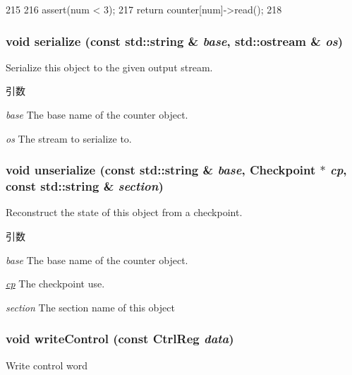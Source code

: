 \begin{DoxyCode}
215     {
216         assert(num < 3);
217         return counter[num]->read();
218     }
\end{DoxyCode}
\hypertarget{classIntel8254Timer_ab4138b21b48e3371a8e20df72b675a88}{
\subsubsection[{serialize}]{\setlength{\rightskip}{0pt plus 5cm}void serialize (const std::string \& {\em base}, \/  std::ostream \& {\em os})}}
\label{classIntel8254Timer_ab4138b21b48e3371a8e20df72b675a88}
Serialize this object to the given output stream. 
\begin{DoxyParams}{引数}
\item[{\em base}]The base name of the counter object. \item[{\em os}]The stream to serialize to. \end{DoxyParams}
\hypertarget{classIntel8254Timer_a147c320e3d6506edf5587a40cd8e430d}{
\subsubsection[{unserialize}]{\setlength{\rightskip}{0pt plus 5cm}void unserialize (const std::string \& {\em base}, \/  {\bf Checkpoint} $\ast$ {\em cp}, \/  const std::string \& {\em section})}}
\label{classIntel8254Timer_a147c320e3d6506edf5587a40cd8e430d}
Reconstruct the state of this object from a checkpoint. 
\begin{DoxyParams}{引数}
\item[{\em base}]The base name of the counter object. \item[{\em \hyperlink{namespacecp}{cp}}]The checkpoint use. \item[{\em section}]The section name of this object \end{DoxyParams}
\hypertarget{classIntel8254Timer_a743f89777689003889da83c129eaae33}{
\subsubsection[{writeControl}]{\setlength{\rightskip}{0pt plus 5cm}void writeControl (const CtrlReg {\em data})}}
\label{classIntel8254Timer_a743f89777689003889da83c129eaae33}
Write control word 



